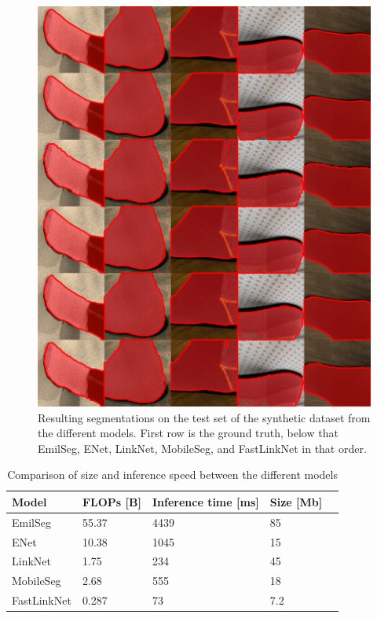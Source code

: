 \documentclass{kththesis}
\begin{document}
 \begin{figure}[h]
  \centering
  \includegraphics[width=\textwidth]{test_color}
  \caption{Resulting segmentations on the test set of the synthetic dataset from the different models. First row is the ground
    truth, below that EmilSeg, ENet, LinkNet, MobileSeg, and FastLinkNet in that
    order.}
  \label{fig:seg_test}
  \end{figure}
  
\begin{table}[]
\centering
\caption{Comparison of size and inference speed between the different models }
\label{tab:res_resources}
\begin{tabular}{@{}lllll@{}}
\toprule
Model       & FLOPs [B]& Inference time {[}ms{]} & Size {[}Mb{]}  \\ \midrule
EmilSeg     &  55.37   & 4439                    & 85             \\
ENet        &  10.38   & 1045                    & 15             \\
LinkNet     &  1.75    & 234                     & 45             \\
MobileSeg   &  2.68    & 555                     & 18             \\
FastLinkNet &  0.287   & 73                      & 7.2            \\ \bottomrule
\end{tabular}
\end{table}
\end{document}
